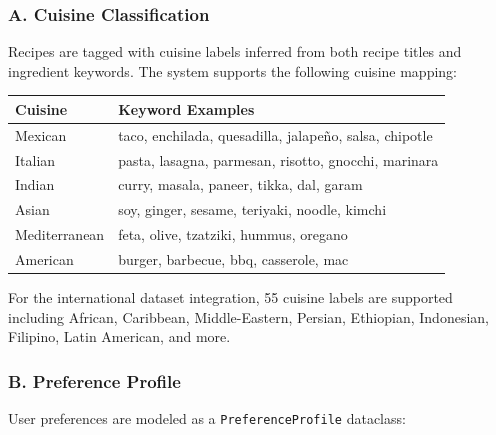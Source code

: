 \documentclass[10pt,conference,compsoc]{IEEEtran}
\begin{document}
\subsubsection{A. Cuisine
Classification}\label{a.-cuisine-classification}

Recipes are tagged with cuisine labels inferred from both recipe titles
and ingredient keywords. The system supports the following cuisine
mapping:

\begin{longtable}[]{@{}ll@{}}
\toprule\noalign{}
Cuisine & Keyword Examples \\
\midrule\noalign{}
\endhead
\bottomrule\noalign{}
\endlastfoot
Mexican & taco, enchilada, quesadilla, jalapeño, salsa, chipotle \\
Italian & pasta, lasagna, parmesan, risotto, gnocchi, marinara \\
Indian & curry, masala, paneer, tikka, dal, garam \\
Asian & soy, ginger, sesame, teriyaki, noodle, kimchi \\
Mediterranean & feta, olive, tzatziki, hummus, oregano \\
American & burger, barbecue, bbq, casserole, mac \\
\end{longtable}

For the international dataset integration, 55 cuisine labels are
supported including African, Caribbean, Middle-Eastern, Persian,
Ethiopian, Indonesian, Filipino, Latin American, and more.

\subsubsection{B. Preference Profile}\label{b.-preference-profile}

User preferences are modeled as a \texttt{PreferenceProfile} dataclass:

\begin{Shaded}
\begin{Highlighting}[]
\NormalTok{    dietary\_restrictions: List[}\NormalTok{]   }
\NormalTok{    allergies: List[}\NormalTok{]              }
\NormalTok{    cuisine\_preferences: List[}\NormalTok{]    }
\NormalTok{    calorie\_target: Optional[}\NormalTok{]     }
\NormalTok{    protein\_target: Optional[}\NormalTok{]}
\NormalTok{    carb\_target: Optional[}\NormalTok{]}
\NormalTok{    fat\_target: Optional[}\NormalTok{]}
\NormalTok{    cooking\_time\_max: Optional[}\NormalTok{]   }
\NormalTok{    budget\_per\_week: Optional[}\NormalTok{]  }
\end{Highlighting}
\end{Shaded}
\end{document}
